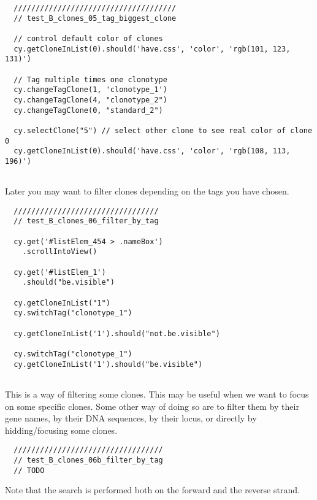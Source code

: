 \begin{verbatim}
  /////////////////////////////////////
  // test_B_clones_05_tag_biggest_clone

  // control default color of clones
  cy.getCloneInList(0).should('have.css', 'color', 'rgb(101, 123, 131)')

  // Tag multiple times one clonotype
  cy.changeTagClone(1, 'clonotype_1')
  cy.changeTagClone(4, "clonotype_2")
  cy.changeTagClone(0, "standard_2")

  cy.selectClone("5") // select other clone to see real color of clone 0
  cy.getCloneInList(0).should('have.css', 'color', 'rgb(108, 113, 196)')


\end{verbatim}

Later you may want to filter clones depending on the tags you have chosen.


\begin{verbatim}
  /////////////////////////////////
  // test_B_clones_06_filter_by_tag

  cy.get('#listElem_454 > .nameBox')
    .scrollIntoView()

  cy.get('#listElem_1')
    .should("be.visible")

  cy.getCloneInList("1")
  cy.switchTag("clonotype_1")

  cy.getCloneInList('1').should("not.be.visible")

  cy.switchTag("clonotype_1")
  cy.getCloneInList('1').should("be.visible")


\end{verbatim}

This is a way of filtering some clones. This may be useful when we want to
focus on some specific clones. Some other way of doing so are to filter them by
their gene names, by their DNA sequences, 
by their locus,
or directly by hidding/focusing some clones.


\begin{verbatim}
  //////////////////////////////////
  // test_B_clones_06b_filter_by_tag
  // TODO

\end{verbatim}

Note that the search is performed both on the forward and the reverse strand.

